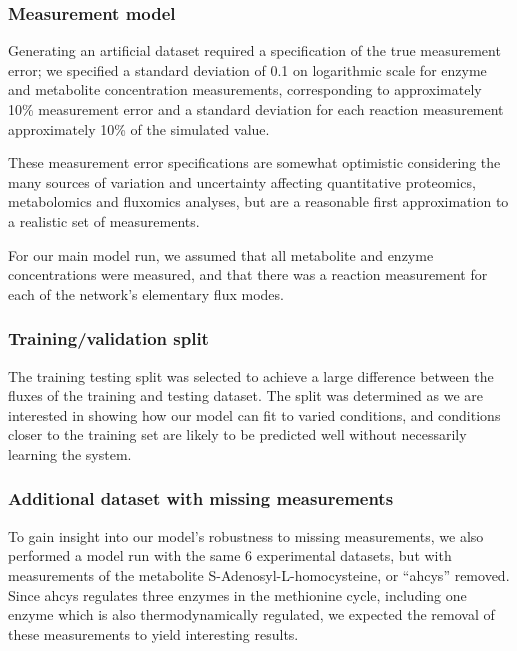 \documentclass[journal=,manuscript=]{achemso}
\begin{document}
\hypertarget{measurement-model}{%
\subsubsection{Measurement model}\label{measurement-model}}

Generating an artificial dataset required a specification of the true
measurement error; we specified a standard deviation of 0.1 on
logarithmic scale for enzyme and metabolite concentration measurements,
corresponding to approximately 10\% measurement error and a standard
deviation for each reaction measurement approximately 10\% of the
simulated value.

These measurement error specifications are somewhat optimistic
considering the many sources of variation and uncertainty affecting
quantitative proteomics, metabolomics and fluxomics analyses, but are a
reasonable first approximation to a realistic set of measurements.

For our main model run, we assumed that all metabolite and enzyme
concentrations were measured, and that there was a reaction measurement
for each of the network's elementary flux modes.

\hypertarget{trainingvalidation-split}{%
\subsubsection{Training/validation
split}\label{trainingvalidation-split}}

The training testing split was selected to achieve a large difference
between the fluxes of the training and testing dataset. The split was
determined as we are interested in showing how our model can fit to
varied conditions, and conditions closer to the training set are likely
to be predicted well without necessarily learning the system.

\hypertarget{additional-dataset-with-missing-measurements}{%
\subsubsection{Additional dataset with missing
measurements}\label{additional-dataset-with-missing-measurements}}

To gain insight into our model's robustness to missing measurements, we
also performed a model run with the same 6 experimental datasets, but
with measurements of the metabolite S-Adenosyl-L-homocysteine, or
``ahcys'' removed. Since ahcys regulates three enzymes in the methionine
cycle, including one enzyme which is also thermodynamically regulated,
we expected the removal of these measurements to yield interesting
results.
\end{document}
